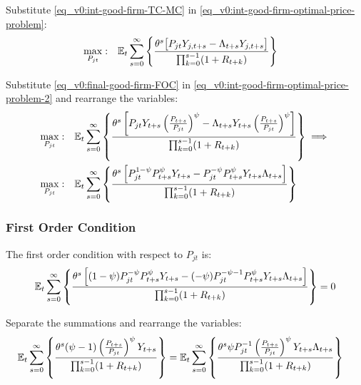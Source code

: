 \documentclass[
thesis.tex
]{subfiles}
\begin{document}
	
	Substitute \ref{eq_v0:int-good-firm-TC-MC} in \ref{eq_v0:int-good-firm-optimal-price-problem}:
	\begin{align}
		\label{eq_v0:int-good-firm-optimal-price-problem-2}
		\max_{P_{jt}}: & \quad {\mathbb{E}_{t}} \sum_{s=0}^{\infty} \left\{ \frac{\theta^s \big[ P_{jt} Y_{j,t+s} - \Lambda_{t+s} Y_{j,t+s} \big]}{\prod_{k=0}^{s-1}(1+R_{t+k})} \right\}
	\end{align}
	
	Substitute \ref{eq_v0:final-good-firm-FOC} in \ref{eq_v0:int-good-firm-optimal-price-problem-2} and rearrange the variables:
	\begin{align}
		\max_{P_{jt}}: & \quad {\mathbb{E}_{t}} \sum_{s=0}^{\infty} \left\{ \frac{\theta^s \left[ P_{jt} Y_{t+s} \left( \frac{P_{t+s}}{P_{jt}} \right)^{\psi} - \Lambda_{t+s} Y_{t+s} \left( \frac{P_{t+s}}{P_{jt}} \right)^{\psi} \right] }{\prod_{k=0}^{s-1}(1+R_{t+k})} \right\} \implies \nonumber 
		\\
		\max_{P_{jt}}: & \quad {\mathbb{E}_{t}} \sum_{s=0}^{\infty} \left\{ \frac{\theta^s \left[ P_{jt}^{1-\psi} P_{t+s}^{\psi} Y_{t+s} - P_{jt}^{-\psi} P_{t+s}^{\psi} Y_{t+s} \Lambda_{t+s} \right] }{\prod_{k=0}^{s-1}(1+R_{t+k})} \right\} \nonumber
	\end{align}
	
	
	\subsubsection*{First Order Condition}
	
	The first order condition with respect to $P_{jt}$ is:
	\begin{align}
		& \quad {\mathbb{E}_{t}} \sum_{s=0}^{\infty} \left\{ \frac{\theta^s \left[ (1-\psi) P_{jt}^{-\psi} P_{t+s}^{\psi} Y_{t+s} - (-\psi) P_{jt}^{-\psi-1} P_{t+s}^{\psi} Y_{t+s} \Lambda_{t+s} \right] }{\prod_{k=0}^{s-1}(1+R_{t+k})} \right\} = 0 \nonumber
	\end{align}
	
	
	Separate the summations and rearrange the variables:
	\begin{align}
		\label{eq_v0:int-good-firm-optimal-price-FOC}
		& {\mathbb{E}_{t}} \sum_{s=0}^{\infty} \left\{ \frac{\theta^s (\psi-1) \left( \frac{P_{t+s}} {P_{jt}} \right)^{\psi} Y_{t+s}} {\prod_{k=0}^{s-1} (1+R_{t+k})} \right\} = {\mathbb{E}_{t}} \sum_{s=0}^{\infty} \left\{ \frac{\theta^s \psi P_{jt}^{-1} \left( \frac{P_{t+s}} {P_{jt}} \right)^{\psi} Y_{t+s} \Lambda_{t+s} }{\prod_{k=0}^{s-1}(1+R_{t+k})} \right\}
	\end{align}
	
\end{document}
